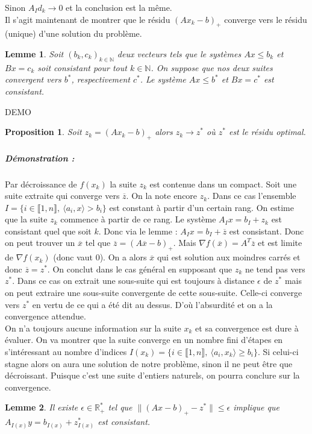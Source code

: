 \documentclass[10pt,a4paper]{article}
\newtheorem{prop}{Proposition}
\newtheorem{lemma}{Lemme}
\begin{document}
Sinon $A_I d_k \rightarrow 0$ et la conclusion est la même.\\
Il s'agit maintenant de montrer que le résidu $(Ax_k-b)_+$ converge vers le résidu (unique) d'une solution du problème.
\begin{lemma}
Soit $(b_k,c_k)_{k \in \mathbb{N}}$ deux vecteurs tels que le systèmes $Ax\le b_k$ et $Bx=c_k$ soit consistant pour tout $k \in \mathbb{N}$.
On suppose que nos deux suites convergent vers $b^*$, respectivement $c^*$.
Le système $Ax \le b^*$ et $Bx=c^*$ est consistant.
\end{lemma}
DEMO
\begin{prop}
Soit $z_k=(Ax_k-b)_+$ alors $z_k \rightarrow z^*$ où $z^*$ est le résidu optimal.
\end{prop}
\subparagraph{Démonstration :} Par décroissance de $f(x_k)$ la suite $z_k$ est contenue dans un compact.
Soit une suite extraite qui converge vers $\overline{z}$.
On la note encore $z_k$.
Dans ce cas l'ensemble $I= \lbrace i \in \llbracket 1,n \rrbracket, \ \langle a_i,x \rangle > b_i \rbrace$ est constant à partir d'un certain rang.
On estime que la suite $z_k$ commence à partir de ce rang.
Le système $A_Ix=b_I+z_k$ est consistant quel que soit $k$.
Donc via le lemme : $A_Ix=b_I+\overline{z}$ est consistant.
Donc on peut trouver un $\overline{x}$ tel que $\overline{z}=(A\overline{x}-b)_+$.
Mais $\nabla f(\overline{x})=A^T \overline{z}$ et est limite de $\nabla f(x_k)$ (donc vaut 0).
On a alors $\overline{x}$ qui est solution aux moindres carrés et donc $\overline{z}=z^*$.
On conclut dans le cas général en supposant que $z_k$ ne tend pas vers $z^*$.
Dans ce cas on extrait une sous-suite qui est toujours à distance $\epsilon$ de $z^*$ mais on peut extraire une sous-suite convergente de cette sous-suite.
Celle-ci converge vers $z^*$ en vertu de ce qui a été dit au dessus.
D'où l'absurdité et on a la convergence attendue.\\
On n'a toujours aucune information sur la suite $x_k$ et sa convergence est dure à évaluer.
On va montrer que la suite converge en un nombre fini d'étapes en s'intéressant au nombre d'indices $I(x_k)=\lbrace i \in \llbracket 1,n \rrbracket, \ \langle a_i,x_k \rangle \ge b_i \rbrace$.
Si celui-ci stagne alors on aura une solution de notre problème, sinon il ne peut être que décroissant.
Puisque c'est une suite d'entiers naturels, on pourra conclure sur la convergence.
\begin{lemma}
Il existe $\epsilon \in \mathbb{R}_+^*$ tel que $\| (Ax-b)_+ -z^* \| \le \epsilon$ implique que $A_{I(x)}y=b_{I(x)}+z_{I(x)}^*$ est consistant.
\end{lemma}
\end{document}
